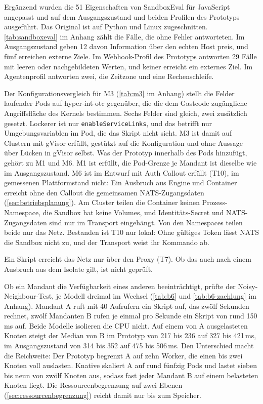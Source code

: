 Ergänzend wurden die 51 Eigenschaften von SandboxEval \autocite[S.~1--2]{rabin_sandboxeval_2025} für JavaScript
angepasst und auf dem Ausgangszustand und beiden Profilen des
Prototyps ausgeführt. Das Original ist auf Python und Linux zugeschnitten.
\autoref{tab:sandboxeval} im Anhang zählt die Fälle, die ohne Fehler antworteten. Im
Ausgangszustand geben 12 davon Information über den echten Host preis, und fünf erreichen externe Ziele. Im Webhook-Profil des Prototyps antworten
29 Fälle mit leeren oder nachgebildeten Werten, und keiner erreicht ein externes Ziel. Im Agentenprofil antworten
zwei, die Zeitzone und eine Rechenschleife.

Der Konfigurationsvergleich für M3 (\autoref{tab:m3} im Anhang) stellt die Felder laufender Pods auf hyper-int-otc
gegenüber, die die dem Gastcode zugängliche Angriffsfläche des Kernels bestimmen. Sechs Felder sind gleich, zwei zusätzlich gesetzt.
Lockerer ist nur \texttt{enableServiceLinks}, und das betrifft nur Umgebungsvariablen im
Pod, die das Skript nicht sieht. M3 ist damit auf Clustern mit gVisor erfüllt, gestützt auf die Konfiguration und ohne
Aussage über Lücken in gVisor selbst. Was der Prototyp innerhalb des Pods hinzufügt, gehört zu M1 und M6. M1 ist erfüllt,
die Pod-Grenze je Mandant ist dieselbe wie im Ausgangszustand. M6 ist im Entwurf mit Auth Callout erfüllt (T10), im
gemessenen Plattformstand nicht: Ein Ausbruch aus Engine und Container erreicht ohne den Callout die gemeinsamen
NATS-Zugangsdaten (\autoref{sec:betriebsplanung}). Am Cluster teilen die Container keinen Prozess-Namespace, die Sandbox
hat keine Volumes, und Identitäts-Secret und NATS-Zugangsdaten sind nur im Transport eingehängt. Von den Namespaces teilen
beide nur das Netz. Bestanden ist T10 nur lokal: Ohne gültiges Token lässt NATS die Sandbox nicht zu, und der Transport weist ihr
Kommando ab.

Ein Skript erreicht das Netz nur über den Proxy (T7). Ob das auch nach einem Ausbruch aus dem Isolate gilt, ist nicht geprüft.

Ob ein Mandant die Verfügbarkeit eines anderen beeinträchtigt, prüfte der Noisy-Neighbour-Test, je Modell dreimal im
Wechsel (\autoref{tab:b6} und \autoref{tab:b6-zaehlung} im Anhang). Mandant A ruft mit 40 Aufrufern ein Skript auf, das
zwölf Sekunden rechnet, zwölf Mandanten B rufen je einmal pro Sekunde ein Skript von rund 150\,ms auf. Beide Modelle
isolieren die \ac{CPU} nicht. Auf einem von A ausgelasteten Knoten steigt der Median von B im Prototyp von 217 bis 236 auf
327 bis 421\,ms, im Ausgangszustand von 314 bis 352 auf 475 bis 506\,ms. Den Unterschied macht die Reichweite: Der
Prototyp begrenzt A auf zehn Worker, die einen bis zwei Knoten voll auslasten. Knative skaliert A auf rund fünfzig Pods
und lastet sieben bis neun von zwölf Knoten aus, sodass fast jeder Mandant B auf einem belasteten Knoten liegt. Die
Ressourcenbegrenzung auf zwei Ebenen (\autoref{sec:ressourcenbegrenzung}) reicht damit nur bis zum Speicher.

